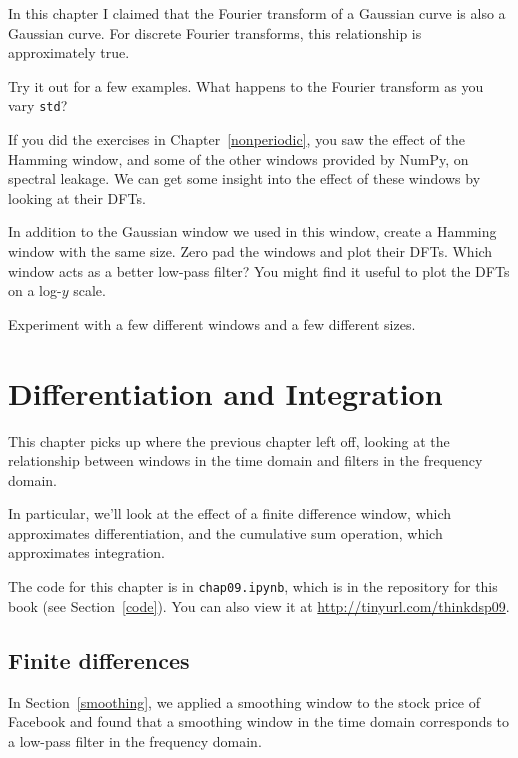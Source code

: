 \documentclass[12pt]{book} \usepackage[width=5.5in,height=8.5in, hmarginratio=3:2,vmarginratio=1:1]{geometry}
\begin{document}
\begin{exercise} In this chapter I claimed that the Fourier transform of a Gaussian curve is also a Gaussian curve. For discrete Fourier transforms, this relationship is approximately true. 

Try it out for a few examples. What happens to the Fourier transform as you vary {\tt std}? \end{exercise} 

\begin{exercise} If you did the exercises in Chapter~\ref{nonperiodic}, you saw the effect of the Hamming window, and some of the other windows provided by NumPy, on spectral leakage. We can get some insight into the effect of these windows by looking at their DFTs. 

In addition to the Gaussian window we used in this window, create a Hamming window with the same size. Zero pad the windows and plot their DFTs. Which window acts as a better low-pass filter? You might find it useful to plot the DFTs on a log-$y$ scale. 

Experiment with a few different windows and a few different sizes. \end{exercise} 

\chapter{Differentiation and Integration} \label{diffint} 

This chapter picks up where the previous chapter left off, looking at the relationship between windows in the time domain and filters in the frequency domain. 

In particular, we'll look at the effect of a finite difference window, which approximates differentiation, and the cumulative sum operation, which approximates integration. 

The code for this chapter is in {\tt chap09.ipynb}, which is in the repository for this book (see Section~\ref{code}). You can also view it at \url{http://tinyurl.com/thinkdsp09}. 

\section{Finite differences} \label{diffs} 

In Section~\ref{smoothing}, we applied a smoothing window to the stock price of Facebook and found that a smoothing window in the time domain corresponds to a low-pass filter in the frequency domain. 
\end{document}
